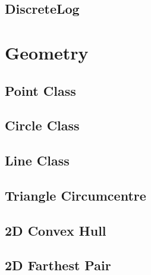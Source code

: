 \documentclass[a4paper,10pt,twocolumn,oneside]{article}
\begin{document}
\subsection{DiscreteLog}

%
%

\section{Geometry}
\subsection{Point Class}

\subsection{Circle Class}
%

\subsection{Line Class}

\subsection{Triangle Circumcentre}

%
\subsection{2D Convex Hull}

\subsection{2D Farthest Pair}

\end{document}
